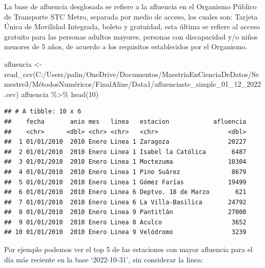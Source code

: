 \documentclass[
]{article}
\newenvironment{Shaded}{\begin{snugshade}}{\end{snugshade}}
\newcommand{\DecValTok}[1]{\textcolor[rgb]{0.00,0.00,0.81}{#1}}
\newcommand{\FunctionTok}[1]{\textcolor[rgb]{0.00,0.00,0.00}{#1}}
\newcommand{\NormalTok}[1]{#1}
\newcommand{\OtherTok}[1]{\textcolor[rgb]{0.56,0.35,0.01}{#1}}
\newcommand{\SpecialCharTok}[1]{\textcolor[rgb]{0.00,0.00,0.00}{#1}}
\newcommand{\StringTok}[1]{\textcolor[rgb]{0.31,0.60,0.02}{#1}}
\begin{document}
La base de afluencia desglosada se refiere a la afluencia en el
Organismo Público de Transporte STC Metro, separada por medio de acceso,
los cuales son: Tarjeta Única de Movilidad Integrada, boleto y
gratuidad, esta última se refiere al acceso gratuito para las personas
adultos mayores, personas con discapacidad y/o niños menores de 5 años,
de acuerdo a los requisitos establecidos por el Organismo.

\begin{Shaded}
\begin{Highlighting}[]
\NormalTok{afluencia }\OtherTok{\textless{}{-}}\FunctionTok{read\_csv}\NormalTok{(}\StringTok{\textquotesingle{}C:/Users/palin/OneDrive/Documentos/MaestriaEnCienciaDeDatos/Semestre3/MétodosNuméricos/FinalAline/Data1/afluenciastc\_simple\_01\_12\_2022.csv\textquotesingle{}}\NormalTok{)}
\NormalTok{afluencia }\SpecialCharTok{\%\textgreater{}\%} \FunctionTok{head}\NormalTok{(}\DecValTok{10}\NormalTok{)}
\end{Highlighting}
\end{Shaded}

\begin{verbatim}
## # A tibble: 10 x 6
##    fecha       anio mes   linea   estacion            afluencia
##    <chr>      <dbl> <chr> <chr>   <chr>                   <dbl>
##  1 01/01/2010  2010 Enero Linea 1 Zaragoza                20227
##  2 01/01/2010  2010 Enero Linea 1 Isabel la Católica       6487
##  3 01/01/2010  2010 Enero Linea 1 Moctezuma               10304
##  4 01/01/2010  2010 Enero Linea 1 Pino Suárez              8679
##  5 01/01/2010  2010 Enero Linea 1 Gómez Farías            19499
##  6 01/01/2010  2010 Enero Linea 6 Deptvo. 18 de Marzo       621
##  7 01/01/2010  2010 Enero Linea 6 La Villa-Basilica       24792
##  8 01/01/2010  2010 Enero Linea 9 Pantitlán               27000
##  9 01/01/2010  2010 Enero Linea 8 Aculco                   3652
## 10 01/01/2010  2010 Enero Linea 9 Velódromo                3239
\end{verbatim}

Por ejemplo podemos ver el top 5 de las estaciones con mayor afluencia
para el día más reciente en la base `2022-10-31', sin considerar la
linea:
\end{document}
